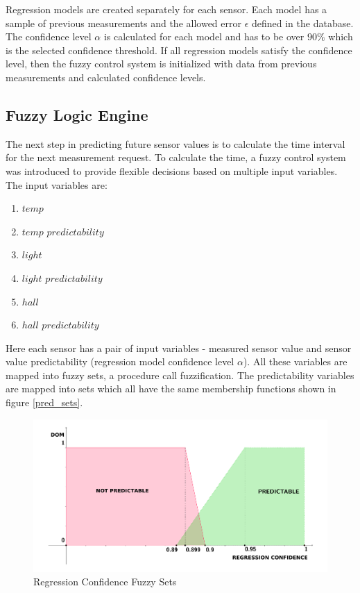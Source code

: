 Regression models are created separately for each sensor. Each model has a sample of previous measurements and the allowed error $\epsilon$ defined in the database. 
The confidence level $\alpha$ is calculated for each model and has to be over $90\%$ which is the selected confidence threshold. If all regression models satisfy the confidence level, then the fuzzy control system is initialized with data from previous measurements and calculated confidence levels. 

\subsection{Fuzzy Logic Engine}

The next step in predicting future sensor values is to calculate the time interval for the next measurement request. To calculate the time, a fuzzy control system was introduced to provide flexible decisions based on multiple input variables. The input variables are: 
\begin{enumerate}
\item $temp$					
\item $temp$ $predictability$	
\item $light$					
\item $light$ $predictability$	
\item $hall$					
\item $hall$ $predictability$
\end{enumerate}

Here each sensor has a pair of input variables - measured sensor value and sensor value predictability (regression model confidence level $\alpha$). All these variables are mapped into fuzzy sets, a procedure call fuzzification. The predictability variables are mapped into sets which all have the same membership functions shown in figure \autoref{pred_sets}.

\begin{figure}[h!]
\centering
\includegraphics[scale=0.58]{4/figures/pred_sets.pdf}
\caption{Regression Confidence Fuzzy Sets}
\label{pred_sets}
\end{figure}

